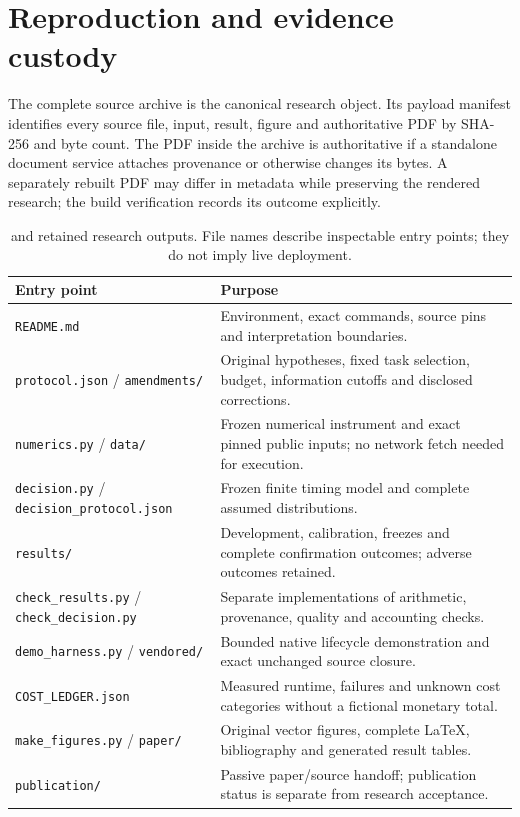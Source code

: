 \section{Reproduction and evidence custody}\label{app:reproduction}
The complete source archive is the canonical research object. Its payload manifest identifies every source file, input, result, figure and authoritative PDF by SHA-256 and byte count. The PDF inside the archive is authoritative if a standalone document service attaches provenance or otherwise changes its bytes. A separately rebuilt PDF may differ in metadata while preserving the rendered research; the build verification records its outcome explicitly.

\begin{table}[ht]\centering\small
\begin{tabularx}{\linewidth}{@{}L{45mm}Y@{}}\toprule
Entry point & Purpose \\\midrule
\texttt{README.md} & Environment, exact commands, source pins and interpretation boundaries. \\
\texttt{protocol.json} / \texttt{amendments/} & Original hypotheses, fixed task selection, budget, information cutoffs and disclosed corrections. \\
\texttt{numerics.py} / \texttt{data/} & Frozen numerical instrument and exact pinned public inputs; no network fetch needed for execution. \\
\texttt{decision.py} / \texttt{decision\_protocol.json} & Frozen finite timing model and complete assumed distributions. \\
\texttt{results/} & Development, calibration, freezes and complete confirmation outcomes; adverse outcomes retained. \\
\texttt{check\_results.py} / \texttt{check\_decision.py} & Separate implementations of arithmetic, provenance, quality and accounting checks. \\
\texttt{demo\_harness.py} / \texttt{vendored/} & Bounded native lifecycle demonstration and exact unchanged source closure. \\
\texttt{COST\_LEDGER.json} & Measured runtime, failures and unknown cost categories without a fictional monetary total. \\
\texttt{make\_figures.py} / \texttt{paper/} & Original vector figures, complete LaTeX, bibliography and generated result tables. \\
\texttt{publication/} & Passive paper/source handoff; publication status is separate from research acceptance. \\\bottomrule
\end{tabularx}
\caption{\source{} and retained research outputs. File names describe inspectable entry points; they do not imply live deployment.}
\end{table}

